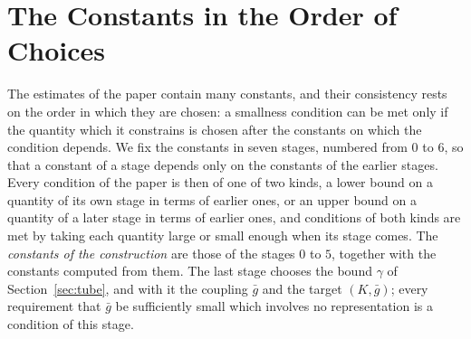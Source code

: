 \documentclass[11pt]{preprint}
\numberwithin{equation}{section}
\theoremstyle{definition}
\theoremstyle{remark}
\theoremstyle{plain}
\begin{document}
\appendix

\section{The Constants in the Order of Choices}\label{app:constants}

The estimates of the paper contain many constants, and their consistency rests on the order in which they are chosen: a smallness condition can be met only if the quantity which it constrains is chosen after the constants on which the condition depends. We fix the constants in seven stages, numbered from $0$ to $6$, so that a constant of a stage depends only on the constants of the earlier stages. Every condition of the paper is then of one of two kinds, a lower bound on a quantity of its own stage in terms of earlier ones, or an upper bound on a quantity of a later stage in terms of earlier ones, and conditions of both kinds are met by taking each quantity large or small enough when its stage comes. The \emph{constants of the construction} are those of the stages $0$ to $5$, together with the constants computed from them. The last stage chooses the bound $\gamma$ of Section~\ref{sec:tube}, and with it the coupling $\bar g$ and the target $(K, \bar g)$; every requirement that $\bar g$ be sufficiently small which involves no representation is a condition of this stage.
\end{document}
